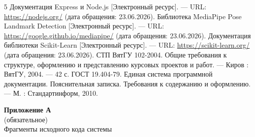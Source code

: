 \documentclass[utf8, russian]{eskdtext}
\begin{document}
\newpage
{}
\begin{thebibliography}{5}
     Документация Express и Node.js [Электронный ресурс]. --- URL: \url{https://nodejs.org/} (дата обращения: 23.06.2026).
     Библиотека MediaPipe Pose Landmark Detection [Электронный ресурс]. --- URL: \url{https://google.github.io/mediapipe/} (дата обращения: 23.06.2026).
     Документация библиотеки Scikit-Learn [Электронный ресурс]. --- URL: \url{https://scikit-learn.org/} (дата обращения: 23.06.2026).
     СТП ВятГУ 102-2004. Общие требования к структуре, оформлению и представлению курсовых проектов и работ. --- Киров : ВятГУ, 2004. --- 42 с.
     ГОСТ 19.404-79. Единая система программной документации. Пояснительная записка. Требования к содержанию и оформлению. --- М. : Стандартинформ, 2010.
\end{thebibliography}

\newpage
\begin{center}
    \textbf{Приложение А}\\
    (обязательное)\\
    Фрагменты исходного кода системы
\end{center}
\end{document}
